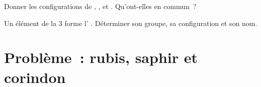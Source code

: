 \begin{exercise}[$\star\star\star$]\label{exo:g10:electron-shells:14}
Donner les configurations de , ,  et
. Qu'ont-elles en commun~?
\end{exercise}

\begin{exercise}[$\star\star\star$]\label{exo:g10:electron-shells:15}
Un élément de la  3 forme l' . Déterminer son
groupe, sa configuration et son nom.
\end{exercise}

\section{Problème~: rubis, saphir et corindon}


